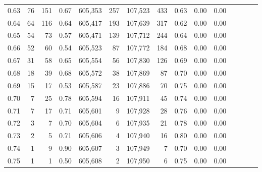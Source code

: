 \begin{tabular}{rrrcrrrrrrrrrrr}
0.63 &      76 &    151 &                                       0.67 &  605,353 &      257 &  107,523 &      433 &  0.63 &  0.00 &                         0.00 \\
0.64 &      64 &    116 &                                       0.64 &  605,417 &      193 &  107,639 &      317 &  0.62 &  0.00 &                         0.00 \\
0.65 &      54 &     73 &                                       0.57 &  605,471 &      139 &  107,712 &      244 &  0.64 &  0.00 &                         0.00 \\
0.66 &      52 &     60 &                                       0.54 &  605,523 &       87 &  107,772 &      184 &  0.68 &  0.00 &                         0.00 \\
0.67 &      31 &     58 &                                       0.65 &  605,554 &       56 &  107,830 &      126 &  0.69 &  0.00 &                         0.00 \\
0.68 &      18 &     39 &                                       0.68 &  605,572 &       38 &  107,869 &       87 &  0.70 &  0.00 &                         0.00 \\
0.69 &      15 &     17 &                                       0.53 &  605,587 &       23 &  107,886 &       70 &  0.75 &  0.00 &                         0.00 \\
0.70 &       7 &     25 &                                       0.78 &  605,594 &       16 &  107,911 &       45 &  0.74 &  0.00 &                         0.00 \\
0.71 &       7 &     17 &                                       0.71 &  605,601 &        9 &  107,928 &       28 &  0.76 &  0.00 &                         0.00 \\
0.72 &       3 &      7 &                                       0.70 &  605,604 &        6 &  107,935 &       21 &  0.78 &  0.00 &                         0.00 \\
0.73 &       2 &      5 &                                       0.71 &  605,606 &        4 &  107,940 &       16 &  0.80 &  0.00 &                         0.00 \\
0.74 &       1 &      9 &                                       0.90 &  605,607 &        3 &  107,949 &        7 &  0.70 &  0.00 &                         0.00 \\
0.75 &       1 &      1 &                                       0.50 &  605,608 &        2 &  107,950 &        6 &  0.75 &  0.00 &                         0.00 \\

\end{tabular}
